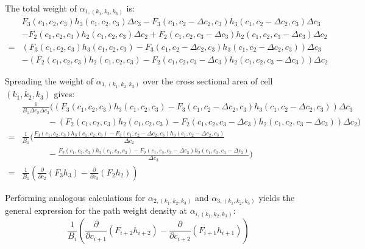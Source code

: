 The total weight of \(\alpha_{1, (k_1, k_2, k_3)}\) is:
\begin{align*}
& F_3(c_1,c_2,c_3)h_3(c_1,c_2,c_3)\Delta c_3 
- F_3(c_1,c_2 - \Delta c_2,c_3)h_3(c_1,c_2 - \Delta c_2,c_3)\Delta c_3 \\
& - F_2(c_1,c_2,c_3)h_2(c_1,c_2,c_3)\Delta c_2
+ F_2(c_1,c_2,c_3 - \Delta c_3)h_2(c_1,c_2,c_3 - \Delta c_3)\Delta c_2 \\ 
= & (F_3(c_1,c_2,c_3)h_3(c_1,c_2,c_3) 
- F_3(c_1,c_2 - \Delta c_2,c_3)h_3(c_1,c_2 - \Delta c_2,c_3))\Delta c_3 \\
& - (F_2(c_1,c_2,c_3)h_2(c_1,c_2,c_3)
- F_2(c_1,c_2,c_3 - \Delta c_3)h_2(c_1,c_2,c_3 - \Delta c_3))\Delta c_2
\end{align*}

Spreading the weight of \(\alpha_{1, (k_1, k_2, k_3)}\) over the cross sectional area of cell \((k_1, k_2, k_3)\) gives:
\begin{align*}
& \frac{1}{B_1 \Delta c_2 \Delta c_3}\bigg((F_3(c_1,c_2,c_3)h_3(c_1,c_2,c_3) 
- F_3(c_1,c_2 - \Delta c_2,c_3)h_3(c_1,c_2 - \Delta c_2,c_3))\Delta c_3 \\ 
& \quad\quad\quad - (F_2(c_1,c_2,c_3)h_2(c_1,c_2,c_3)
- F_2(c_1,c_2,c_3 - \Delta c_3)h_2(c_1,c_2,c_3 - \Delta c_3))\Delta c_2\bigg) \\
= & \frac{1}{B_1}\bigg(\frac{F_3(c_1,c_2,c_3)h_3(c_1,c_2,c_3) - F_3(c_1,c_2 - \Delta c_2,c_3)h_3(c_1,c_2 - \Delta c_2,c_3)}{\Delta c_2} \\ 
& \quad\quad\quad - \frac{F_2(c_1,c_2,c_3)h_2(c_1,c_2,c_3)
- F_2(c_1,c_2,c_3 - \Delta c_3)h_2(c_1,c_2,c_3 - \Delta c_3)}{\Delta c_3}\bigg) \\
= & \frac{1}{B_1}\left(\frac{\partial}{\partial c_2}(F_3 h_3) - \frac{\partial}{\partial c_3}(F_2 h_2)\right)
\end{align*}

Performing analogous calculations for \(\alpha_{2, (k_1, k_2, k_3)}\) and \(\alpha_{3, (k_1, k_2, k_3)}\) yields the general expression for the path weight density at \(\alpha_{i, (k_1, k_2, k_3)}\):
\[\frac{1}{B_i}\left(\frac{\partial}{\partial c_{i+1}}(F_{i+2} h_{i+2}) - \frac{\partial}{\partial c_{i+2}}(F_{i+1} h_{i+1})\right)\]

